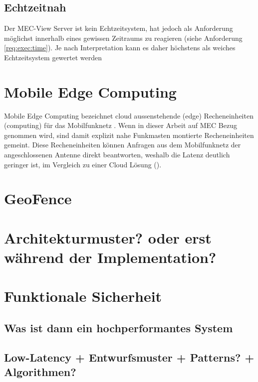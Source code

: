 \subsection{Echtzeitnah}
\label{com:near_real_time}

Der MEC-View Server ist kein Echtzeitsystem, hat jedoch als Anforderung möglichst innerhalb eines gewissen Zeitraums zu reagieren (siehe Anforderung \autoref{req:exec:time}).
Je nach Interpretation kann es daher höchstens als weiches Echtzeitsystem gewertet werden 


\section{Mobile Edge Computing}

Mobile Edge Computing bezeichnet cloud aussenstehende (edge) Recheneinheiten (computing) für das Mobilfunknetz .
Wenn in dieser Arbeit auf MEC Bezug genommen wird, sind damit explizit nahe Funkmasten montierte Recheneinheiten gemeint.
Diese Recheneinheiten können Anfragen aus dem Mobilfunknetz der angeschlossenen Antenne direkt beantworten, weshalb die Latenz deutlich geringer ist, im Vergleich zu einer Cloud Lösung ().


\section{GeoFence}


\section{Architekturmuster? oder erst während der Implementation?}



			
		\section{Funktionale Sicherheit}
			\label{com:safety}
			
		\subsection{Was ist dann ein hochperformantes System}
		\subsection{Low-Latency + Entwurfsmuster + Patterns? + Algorithmen?}
			
